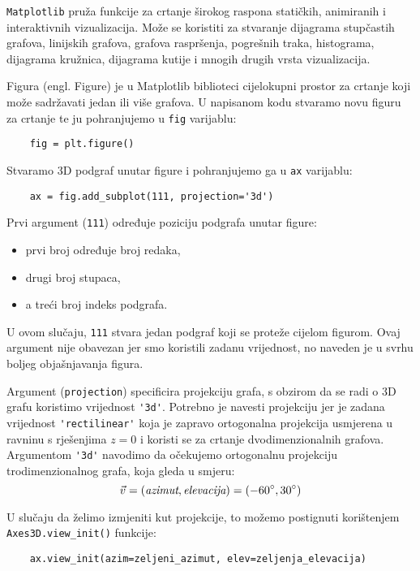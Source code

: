 \verb|Matplotlib| pruža funkcije za crtanje širokog raspona statičkih, animiranih i interaktivnih vizualizacija.
Može se koristiti za stvaranje dijagrama stupčastih grafova, linijskih grafova, grafova raspršenja, pogrešnih traka,
histograma, dijagrama kružnica, dijagrama kutije i mnogih drugih vrsta vizualizacija.

Figura (engl. Figure) je u Matplotlib biblioteci cijelokupni prostor za crtanje koji može sadržavati jedan ili više grafova.
U napisanom kodu stvaramo novu figuru za crtanje te ju pohranjujemo u \verb|fig| varijablu:
\begin{verbatim}
    fig = plt.figure()
\end{verbatim}

Stvaramo 3D podgraf unutar figure i pohranjujemo ga u \verb|ax| varijablu:

\begin{verbatim}
    ax = fig.add_subplot(111, projection='3d')
\end{verbatim} 

Prvi argument (\verb|111|) određuje poziciju podgrafa unutar figure:
\begin{itemize}
    \item prvi broj određuje broj redaka,
    \item drugi broj stupaca,
    \item a treći broj indeks podgrafa.
\end{itemize}
U ovom slučaju, \verb|111| stvara jedan podgraf koji se proteže cijelom figurom. Ovaj argument nije obavezan jer smo koristili zadanu vrijednost, no naveden je u svrhu boljeg objašnjavanja figura.

Argument (\verb|projection|) specificira projekciju grafa, s obzirom da se radi o 3D grafu koristimo vrijednost \verb|'3d'|.
Potrebno je navesti projekciju jer je zadana vrijednost \verb|'rectilinear'| koja je zapravo ortogonalna projekcija usmjerena u ravninu s rješenjima $z = 0$ i koristi se za crtanje dvodimenzionalnih grafova.
Argumentom \verb|'3d'| navodimo da očekujemo ortogonalnu projekciju trodimenzionalnog grafa, koja gleda u smjeru:
$$
    \vec{v} = (\text{\it azimut}, \text{\it elevacija}) = (-60^{\circ}, 30^{\circ})
$$

U slučaju da želimo izmjeniti kut projekcije, to možemo postignuti korištenjem \verb|Axes3D.view_init()| funkcije:
\begin{verbatim}
    ax.view_init(azim=zeljeni_azimut, elev=zeljenja_elevacija)
\end{verbatim}

